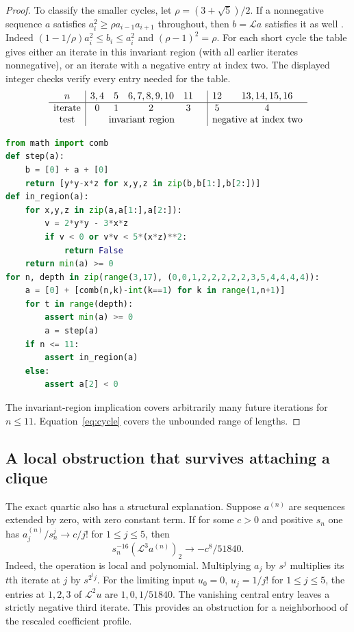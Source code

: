 \documentclass[11pt,a4paper]{article}
\theoremstyle{definition}\newtheorem{problem}[theorem]{Problem}
\begin{document}
\begin{proof}
To classify the smaller cycles, let $\rho=(3+\sqrt5)/2$.
If a nonnegative sequence $a$ satisfies $a_i^2\ge\rho a_{i-1}a_{i+1}$
throughout, then $b=\mathcal La$ satisfies it as well
\cite[Lemma 2.1]{mcs}. Indeed
$(1-1/\rho)a_i^2\le b_i\le a_i^2$ and $(\rho-1)^2=\rho$.
For each short cycle the table gives either an iterate in this
invariant region (with all earlier iterates nonnegative), or an
iterate with a negative entry at index two. The displayed integer
checks verify every entry needed for the table.
\[
\begin{array}{c|ccccc|cc}
 n&3,4&5&6,7,8,9,10&11&&12&13,14,15,16\\ \hline
 \text{iterate}&0&1&2&3&&5&4\\
 \text{test}&\multicolumn{4}{c}{\text{invariant region}}&&
 \multicolumn{2}{c}{\text{negative at index two}}
\end{array}
\]
\begin{lstlisting}[language=Python]
from math import comb
def step(a):
    b = [0] + a + [0]
    return [y*y-x*z for x,y,z in zip(b,b[1:],b[2:])]
def in_region(a):
    for x,y,z in zip(a,a[1:],a[2:]):
        v = 2*y*y - 3*x*z
        if v < 0 or v*v < 5*(x*z)**2:
            return False
    return min(a) >= 0
for n, depth in zip(range(3,17), (0,0,1,2,2,2,2,2,3,5,4,4,4,4)):
    a = [0] + [comb(n,k)-int(k==1) for k in range(1,n+1)]
    for t in range(depth):
        assert min(a) >= 0
        a = step(a)
    if n <= 11:
        assert in_region(a)
    else:
        assert a[2] < 0
\end{lstlisting}
The invariant-region implication covers arbitrarily many future
iterations for $n\le11$. Equation~\eqref{eq:cycle} covers the
unbounded range of lengths.
\end{proof}

\subsection{A local obstruction that survives attaching a clique}
The exact quartic also has a structural explanation. Suppose $a^{(n)}$
are sequences extended by zero, with zero constant term. If for some
$c>0$ and positive $s_n$ one has
$a^{(n)}_j/s_n^j\to c/j!$ for $1\le j\le5$, then
\[
 s_n^{-16}(\mathcal L^3a^{(n)})_2\longrightarrow-c^8/51840.
\]
Indeed, the operation is local and polynomial. Multiplying $a_j$ by
$s^j$ multiplies its $t$th iterate at $j$ by $s^{2^t j}$.
For the limiting input $u_0=0$, $u_j=1/j!$ for $1\le j\le5$,
the entries at $1,2,3$ of $\mathcal L^2u$ are $1,0,1/51840$.
The vanishing central entry leaves a strictly negative third iterate.
This provides an obstruction for a neighborhood of the rescaled
coefficient profile.
\end{document}
